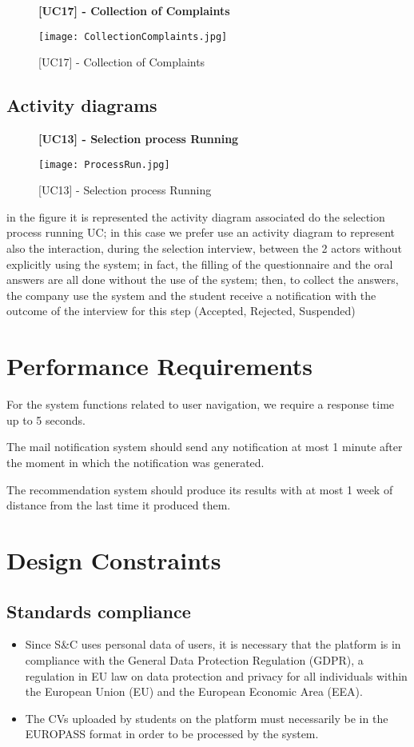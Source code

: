			
			\begin{figure}[H]
				\centering
				{\bfseries [UC17] - Collection of Complaints}
				\caption{[UC17] - Collection of Complaints}
				\texttt{[image: CollectionComplaints.jpg]}
				
			\end{figure}
			
		\subsection{Activity diagrams}
		
			\begin{figure}[H]
				\centering
				{\bfseries [UC13] - Selection process Running}
				\caption{[UC13] - Selection process Running}
				\texttt{[image: ProcessRun.jpg]}
				
			\end{figure}
			
			in the figure it is represented the activity diagram associated do the selection process running UC; in this case we prefer use an activity diagram to represent also the interaction, during the selection interview, between the 2 actors without explicitly using the system; in fact, the filling of the questionnaire and the oral answers are all done without the use of the system; then, to collect the answers, the company use the system and the student receive a notification with the outcome of the interview for this step (Accepted, Rejected, Suspended)
		
	\section{Performance Requirements}
		For the system functions related to user navigation, we require a response time up to 5 seconds.
		
		The mail notification system should send any notification at most 1 minute after the moment in which the notification was generated.
		
		The recommendation system should produce its results with at most 1 week of distance from the last time it produced them.
	\section{Design Constraints}
		\subsection{Standards compliance}
			\begin{itemize}
				\item Since S\&C uses personal data of users, it is necessary that the platform is in compliance with the General Data 		 Protection 	Regulation (GDPR), a regulation in EU law on data protection and privacy for all individuals within the European Union (EU) and the European Economic Area (EEA).
				
				\item The CVs uploaded by students on the platform must necessarily be in the EUROPASS format in order to be processed by the system.
			\end{itemize}
			
